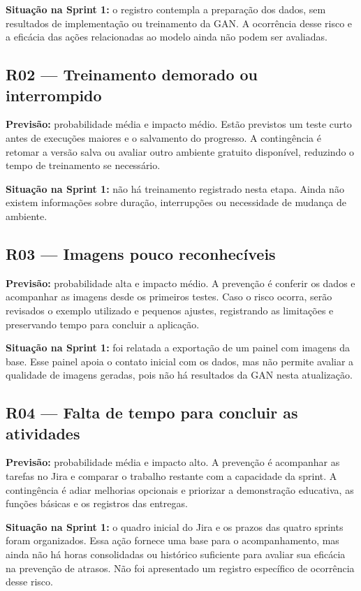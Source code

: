 \documentclass[12pt,a4paper]{article}
\begin{document}
\textbf{Situação na Sprint 1:} o registro contempla a preparação dos dados, sem resultados de implementação ou treinamento da GAN. A ocorrência desse risco e a eficácia das ações relacionadas ao modelo ainda não podem ser avaliadas.

\subsection*{R02 — Treinamento demorado ou interrompido}
\textbf{Previsão:} probabilidade média e impacto médio. Estão previstos um teste curto antes de execuções maiores e o salvamento do progresso. A contingência é retomar a versão salva ou avaliar outro ambiente gratuito disponível, reduzindo o tempo de treinamento se necessário.

\textbf{Situação na Sprint 1:} não há treinamento registrado nesta etapa. Ainda não existem informações sobre duração, interrupções ou necessidade de mudança de ambiente.

\subsection*{R03 — Imagens pouco reconhecíveis}
\textbf{Previsão:} probabilidade alta e impacto médio. A prevenção é conferir os dados e acompanhar as imagens desde os primeiros testes. Caso o risco ocorra, serão revisados o exemplo utilizado e pequenos ajustes, registrando as limitações e preservando tempo para concluir a aplicação.

\textbf{Situação na Sprint 1:} foi relatada a exportação de um painel com imagens da base. Esse painel apoia o contato inicial com os dados, mas não permite avaliar a qualidade de imagens geradas, pois não há resultados da GAN nesta atualização.

\subsection*{R04 — Falta de tempo para concluir as atividades}
\textbf{Previsão:} probabilidade média e impacto alto. A prevenção é acompanhar as tarefas no Jira e comparar o trabalho restante com a capacidade da sprint. A contingência é adiar melhorias opcionais e priorizar a demonstração educativa, as funções básicas e os registros das entregas.

\textbf{Situação na Sprint 1:} o quadro inicial do Jira e os prazos das quatro sprints foram organizados. Essa ação fornece uma base para o acompanhamento, mas ainda não há horas consolidadas ou histórico suficiente para avaliar sua eficácia na prevenção de atrasos. Não foi apresentado um registro específico de ocorrência desse risco.
\end{document}
